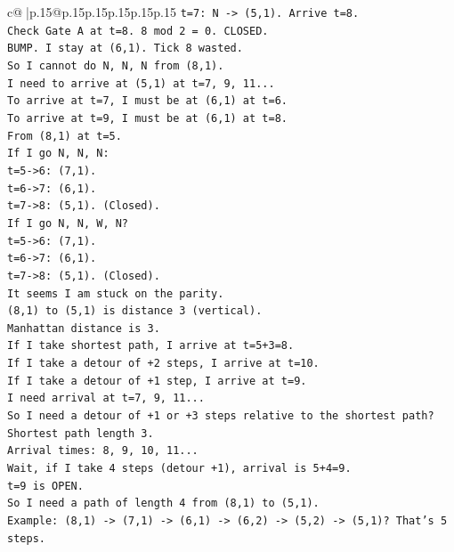 \documentclass{article}
\begin{document}
{\begin{supertabular}{c@{$\;$}|p{.15\linewidth}@{}p{.15\linewidth}p{.15\linewidth}p{.15\linewidth}p{.15\linewidth}p{.15\linewidth}}
{{{\texttt{t=7: N {-}> (5,1). Arrive t=8.} \\
\texttt{Check Gate A at t=8. 8 mod 2 = 0. CLOSED.} \\
\texttt{BUMP. I stay at (6,1). Tick 8 wasted.} \\
\texttt{So I cannot do N, N, N from (8,1).} \\
\texttt{I need to arrive at (5,1) at t=7, 9, 11...} \\
\texttt{To arrive at t=7, I must be at (6,1) at t=6.} \\
\texttt{To arrive at t=9, I must be at (6,1) at t=8.} \\
\texttt{From (8,1) at t=5.} \\
\texttt{If I go N, N, N:} \\
\texttt{t=5{-}>6: (7,1).} \\
\texttt{t=6{-}>7: (6,1).} \\
\texttt{t=7{-}>8: (5,1). (Closed).} \\
\texttt{If I go N, N, W, N?} \\
\texttt{t=5{-}>6: (7,1).} \\
\texttt{t=6{-}>7: (6,1).} \\
\texttt{t=7{-}>8: (5,1). (Closed).} \\
\texttt{It seems I am stuck on the parity.} \\
\texttt{(8,1) to (5,1) is distance 3 (vertical).} \\
\texttt{Manhattan distance is 3.} \\
\texttt{If I take shortest path, I arrive at t=5+3=8.} \\
\texttt{If I take a detour of +2 steps, I arrive at t=10.} \\
\texttt{If I take a detour of +1 step, I arrive at t=9.} \\
\texttt{I need arrival at t=7, 9, 11...} \\
\texttt{So I need a detour of +1 or +3 steps relative to the shortest path?} \\
\texttt{Shortest path length 3.} \\
\texttt{Arrival times: 8, 9, 10, 11...} \\
\texttt{Wait, if I take 4 steps (detour +1), arrival is 5+4=9.} \\
\texttt{t=9 is OPEN.} \\
\texttt{So I need a path of length 4 from (8,1) to (5,1).} \\
\texttt{Example: (8,1) {-}> (7,1) {-}> (6,1) {-}> (6,2) {-}> (5,2) {-}> (5,1)? That's 5 steps.} \\
}}}
\end{supertabular}}
\end{document}
